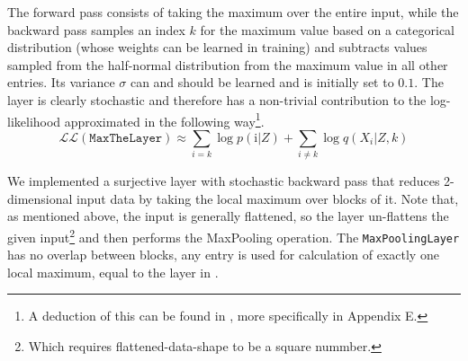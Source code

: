 The forward pass consists of taking the maximum over the entire input, while the backward pass samples an index $k$ for the maximum value based on a categorical distribution (whose weights can be learned in training) and subtracts values sampled from the half-normal distribution from the maximum value in all other entries. Its variance $\sigma$ can and should be learned and is initially set to $0.1$. The layer is clearly stochastic and therefore has a non-trivial contribution to the log-likelihood approximated in the following way\footnote{A deduction of this can be found in \cite{nielsen2020survae}, more specifically in Appendix E.}.
\begin{equation}
\mathcal{LL}(\texttt{MaxTheLayer}) \approx
   \sum_{i = k} \log p(\text{i}|Z) + \sum_{i \neq k} \log q(X_i|Z,k) 
\end{equation}

\label{sec:max_pooling_layer}
We implemented a surjective layer with stochastic backward pass that reduces 2-dimensional input data by taking the local maximum over blocks of it. Note that, as mentioned above, the input is generally flattened, so the layer un-flattens the given input\footnote{Which requires flattened-data-shape to be a square nummber.} and then performs the MaxPooling operation. The \texttt{MaxPoolingLayer} has no overlap between blocks, any entry is used for calculation of exactly one local maximum, equal to the layer in \cite{nielsen2020survae}.

